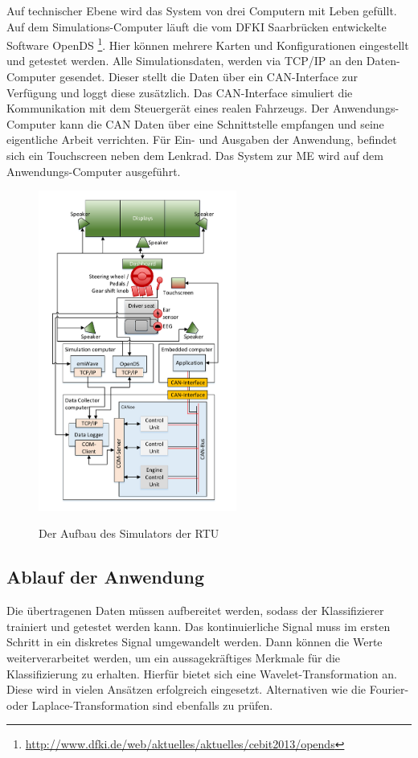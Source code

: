 {Auf technischer Ebene wird das System von drei Computern mit Leben gefüllt. Auf dem Simulations-Computer läuft die vom DFKI Saarbrücken entwickelte Software OpenDS \footnote{\url{http://www.dfki.de/web/aktuelles/aktuelles/cebit2013/opends}}. Hier können mehrere Karten und Konfigurationen eingestellt und getestet werden. 
Alle Simulationsdaten, werden via TCP/IP an den Daten-Computer  gesendet. Dieser stellt die Daten über ein CAN-Interface zur Verfügung und loggt diese zusätzlich. Das CAN-Interface simuliert die Kommunikation mit dem Steuergerät eines realen Fahrzeugs. 
Der Anwendungs-Computer kann die CAN Daten über eine Schnittstelle empfangen und seine eigentliche Arbeit verrichten. Für Ein- und Ausgaben der Anwendung, befindet sich ein Touchscreen neben dem Lenkrad. Das System zur \acl{ME} wird auf dem Anwendungs-Computer ausgeführt.
\begin{figure}[h] 
  \begin{center}
    \includegraphics[width=6.5cm]{img/architecture}
    \label{fig:architecure}
    \caption[Aufbau des Simulators]{Der Aufbau des Simulators der \acl{RTU}}
  \end{center}
\end{figure}

\subsection{Ablauf der Anwendung}
Die übertragenen Daten müssen aufbereitet werden, sodass der Klassifizierer trainiert und getestet werden kann. Das kontinuierliche Signal muss im ersten Schritt in ein diskretes Signal umgewandelt werden. Dann können die Werte weiterverarbeitet werden, um ein aussagekräftiges Merkmale für die Klassifizierung zu erhalten. Hierfür bietet sich eine Wavelet-Transformation \cite{Chui:1992:IW:163196} an. Diese wird in vielen Ansätzen erfolgreich eingesetzt. Alternativen wie die Fourier- \cite{Bochner_1} oder Laplace-Transformation \cite{Widder_1} sind ebenfalls zu prüfen.

}
